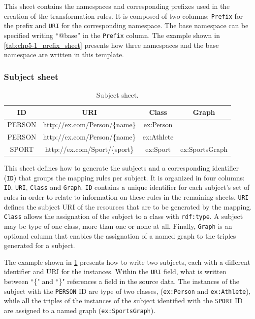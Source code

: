 This sheet contains the namespaces and corresponding prefixes used in the creation of the transformation rules. 
It is composed of two columns: \texttt{Prefix} for the prefix and \texttt{URI} for the corresponding namespace. The base namespace can be specified writing ``@base'' in the \texttt{Prefix} column. 
The example shown in \cref{tab:chp5-1_prefix_sheet} presents how three namespaces and the base namespace are written in this template. 

\subsubsection{Subject sheet} 

\begin{table}[h!]
\caption{Subject sheet.}
\label{tab:chp5-1_subject_sheet}
\centering
\begin{tabular}{c|c|c|c}
\midrule
\textbf{ID} & \textbf{URI} & \textbf{Class} & \textbf{Graph} \\ \midrule
PERSON & http://ex.com/Person/\{name\} & ex:Person &  \\
PERSON & http://ex.com/Person/\{name\} & ex:Athlete &  \\
SPORT & http://ex.com/Sport/\{sport\} & ex:Sport & ex:SportsGraph \\ \midrule
\end{tabular}
\end{table}


This sheet defines how to generate the subjects and a corresponding identifier (\texttt{ID}) that groups the mapping rules per subject. It is organized in four columns: \texttt{ID}, \texttt{URI}, \texttt{Class} and \texttt{Graph}. \texttt{ID} contains a unique identifier for each subject's set of rules in order to relate to information on these rules in the remaining sheets.
\texttt{URI} defines the subject URI of the resources that are to be generated by the mapping. 
\texttt{Class} allows the assignation of the subject to a class with \texttt{rdf:type}. A subject may be type of one class, more than one or none at all. 
Finally, \texttt{Graph} is an optional column that enables the assignation of a named graph to the triples generated for a subject.

The example shown in \cref{tab:chp5-1_subject_sheet} presents how to write two subjects, each with a different identifier and URI for the instances. Within the \texttt{URI} field, what is written between ``\{" and ``\}" references a field in the source data. The instances of the subject with the \texttt{PERSON} ID are type of two classes, (\texttt{ex:Person} and \texttt{ex:Athlete}), while all the triples of the instances of the subject identified with the \texttt{SPORT} ID are assigned to a named graph (\texttt{ex:SportsGraph}). 



